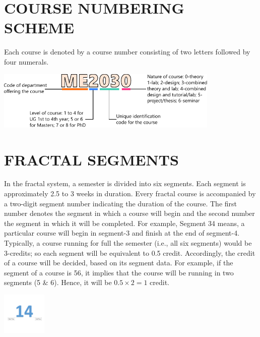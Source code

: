 \section{COURSE NUMBERING SCHEME}
Each course is denoted by a course number consisting of two letters followed by four numerals.
\begin{center}
    \includegraphics[width=0.8\textwidth, angle=0]{./parts/code-explain.pdf}
\end{center}


\section{FRACTAL SEGMENTS}
In the fractal system, a semester is divided into six segments. Each segment is approximately 2.5 to 3 weeks in duration. Every fractal course is accompanied by a two-digit segment number indicating the duration of the course. The first number denotes the segment in which a course will begin and the second number the segment in which it will be completed. For example, Segment 34 means, a particular course will begin in segment-3 and finish at the end of segment-4. Typically, a course running for full the semester (i.e., all six segments) would be 3-credits; so each segment will be equivalent to 0.5 credit. Accordingly, the credit of a course will be decided, based on its segment data. For example, if the segment of a course is 56, it implies that the course will be running in two segments (5 \& 6). Hence, it will be $0.5 \times 2 = 1$ credit. 

\begin{center}
\includegraphics[height=2cm]{./parts/course-segment}
\end{center}

